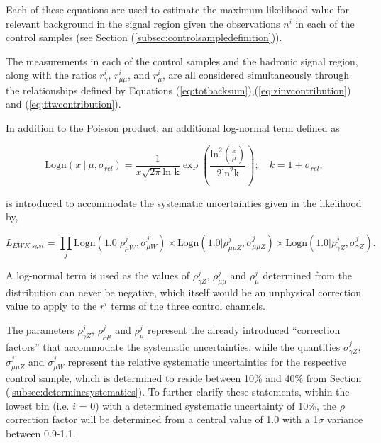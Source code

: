 Each of these equations are used to estimate the maximum likelihood value for relevant background in the signal region given the observations $n^{i}$ in each of the control samples (see Section (\ref{subsec:controlsampledefinition})).

The measurements in each of the control samples and the hadronic signal region, along with the ratios $r^{i}_{\gamma}$, $r^{i}_{\mu\mu}$, and $r^{i}_{\mu}$, are all considered simultaneously through the relationships defined by Equations (\ref{eq:totbacksum}),(\ref{eq:zinvcontribution}) and (\ref{eq:ttwcontribution}).

In addition to the Poisson product, an additional log-normal term \cite{logndistribution} defined as

\begin{equation}
\text{Logn}(x\ |\ \xspace \mu, \sigma_{rel}) = \frac{1}{x\sqrt{2\pi}\text{ln k}}\exp\left(\frac{\text{ln}^{2}(\frac{x}{\mu})}{2\text{ln}^{2}\text{k}}\right); \quad k = 1 + \sigma_{rel},
\end{equation}

is introduced to accommodate the systematic uncertainties given in the likelihood by,

\begin{equation}
L_{EWK\ syst} = \prod_{j} \text{Logn}(1.0|\rho^{j}_{\mu W},\sigma^{j}_{\mu W} ) \times \text{Logn}(1.0|\rho^{j}_{\mu\mu Z},\sigma^{j}_{\mu\mu Z} ) \times \text{Logn}(1.0|\rho^{j}_{\gamma Z},\sigma^{j}_{\gamma Z} ).
\end{equation}

A log-normal term is used as the values of $\rho^{j}_{\gamma Z}$, $\rho^{j}_{\mu\mu}$ and $\rho^{j}_{\mu}$ determined from the distribution can never be negative, which itself would be an unphysical correction value to apply to the $r^{i}$ terms of the three control channels. 

The parameters $\rho^{j}_{\gamma Z}$, $\rho^{j}_{\mu\mu}$ and $\rho^{j}_{\mu}$ represent the already introduced ``correction factors'' that accommodate the systematic uncertainties, while the quantities $\sigma^{j}_{\gamma Z}$, $\sigma^{j}_{\mu\mu Z}$ and $\sigma^{j}_{\mu W}$ represent the relative systematic uncertainties for the respective control sample, which is determined to reside between 10\% and 40\% from Section (\ref{subsec:determinesystematics}). To further clarify these statements, within the lowest \theht bin (i.e. \theht $i$ = 0) with a determined systematic uncertainty of 10\%, the $\rho$ correction factor will be determined from a central value of 1.0 with a 1$\sigma$ variance between 0.9-1.1. 

